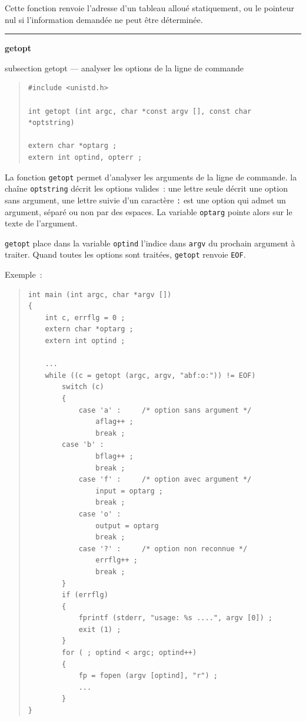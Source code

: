 \documentclass [twoside] {report}
\newcommand {\primitive} [1]
    {
	\phantomsection
	{\large \textbf {#1}}
	\addcontentsline {toc} {subsection} {#1}
    }
\newcommand {\separation}
    {
	\vspace {5mm}
	\nopagebreak
	\hrule
    }
\begin{document}
Cette fonction renvoie l'adresse d'un tableau alloué statiquement,
ou le pointeur nul si l'information demandée ne peut être déterminée.


\separation 
\primitive {getopt} --- analyser les options de la ligne de commande

\begin {quote}
\begin {verbatim}
#include <unistd.h>

int getopt (int argc, char *const argv [], const char *optstring)

extern char *optarg ;
extern int optind, opterr ;
\end{verbatim}
\end {quote}

La fonction \texttt {getopt} permet d'analyser les arguments de
la ligne de commande. la chaîne \texttt {optstring} décrit les
options valides~: une lettre seule décrit une option sans
argument, une lettre suivie d'un caractère \texttt {:} est une
option qui admet un argument, séparé ou non par des espaces.
La variable \texttt {optarg} pointe alors sur le texte de
l'argument.

\texttt {getopt} place dans la variable \texttt {optind} l'indice dans
\texttt {argv} du prochain argument à traiter. Quand toutes les
options sont traitées, \texttt {getopt} renvoie \texttt {EOF}.

Exemple~:

\begin {quote}
\begin {verbatim}
int main (int argc, char *argv [])
{
    int c, errflg = 0 ;
    extern char *optarg ;
    extern int optind ;

    ...
    while ((c = getopt (argc, argv, "abf:o:")) != EOF)
        switch (c)
        {
            case 'a' :     /* option sans argument */
                aflag++ ;
                break ;
	    case 'b' :
                bflag++ ;
                break ;
            case 'f' :     /* option avec argument */
                input = optarg ;
                break ;
            case 'o' :
                output = optarg
                break ;
            case '?' :     /* option non reconnue */
                errflg++ ;
                break ;
        }
        if (errflg)
        {
            fprintf (stderr, "usage: %
            exit (1) ;
        }
        for ( ; optind < argc; optind++)
        {
            fp = fopen (argv [optind], "r") ;
            ...
        }
}
\end{verbatim}
\end {quote}
\end{document}

